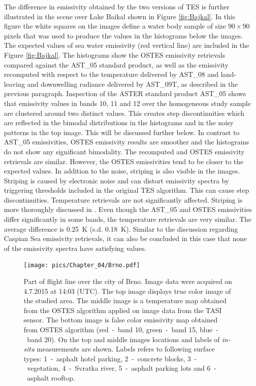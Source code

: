 The difference in emissivity obtained by the two versions of TES is further illustrated in the scene over Lake Baikal shown in Figure \ref{fig:Bajkal}. In this figure the white squares on the images define a water body sample of size $90 \times 90$ pixels that was used to produce the values in the histograms below the images. The expected values of sea water emissivity (red vertical line) are included in the Figure \ref{fig:Bajkal}. The histograms show the OSTES emissivity retrievals compared against the AST\_05 standard product, as well as the emissivity recomputed with respect to the temperature delivered by AST\_08 and land-leaving and downwelling radiance delivered by AST\_09T, as described in the previous paragraph. Inspection of the ASTER standard product AST\_05 shows that emissivity values in bands 10, 11 and 12 over the homogeneous study sample are clustered around two distinct values. This creates step discontinuities which are reflected in the bimodal distributions in the histograms and in the noisy patterns in the top image. This will be discussed further below. In contrast to AST\_05 emissivities, OSTES emissivity results are smoother and the histograms do not show any significant bimodality. The recomputed and OSTES emissivity retrievals are similar. However, the OSTES emissivities tend to be closer to the expected values. In addition to the noise, striping is also visible in the images. Striping is caused by electronic noise and can distort emissivity spectra by triggering thresholds included in the original TES algorithm. This can cause step discontinuities. Temperature retrievals are not significantly affected. Striping is more thoroughly discussed in \cite{GA11}. Even though the AST\_05 and OSTES emissivities differ significantly in some bands, the temperature retrievals are very similar. The average difference is \SI{0.25}{\kelvin} (s.d. \SI{0.18}{\kelvin}). Similar to the discussion regarding Caspian Sea emissivity retrievals, it can also be concluded in this case that none of the emissivity spectra have satisfying values.

\begin{figure}[!t]
\centering
\vspace{0.8 em}
\texttt{[image: pics/Chapter\_04/Brno.pdf]}
\vspace{2 em}
\caption{Part of flight line over the city of Brno. Image data were acquired on 4.7.2015 at 14:03 (UTC). The top image displays true color image of the studied area. The middle image is a temperature map obtained from the OSTES algorithm applied on image data from the TASI sensor. The bottom image is false color emissivity map obtained from OSTES algorithm (red~-~band 10, green~-~band 15, blue~-~band 20). On the top and middle images locations and labels of \textit{in-situ} measurements are shown. Labels refers to following surface types: 1~-~asphalt hotel parking, 2~-~concrete blocks, 3~-~vegetation, 4~-~Svratka river, 5~-~asphalt parking lots and 6~-~asphalt rooftop.}
\label{fig:Brno}
\end{figure}

